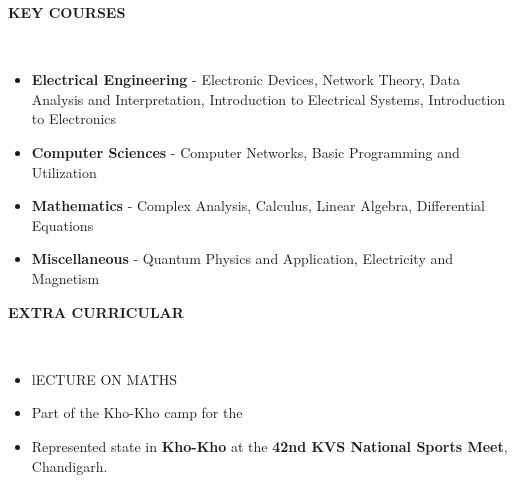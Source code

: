 \documentclass[a4paper,10pt]{article}
\newcommand{\lsep}{-0.5cm}
\newcommand{\resheading}[1]{{\small \colorbox{mygrey}{\begin{minipage}{0.975\textwidth}{\textbf{#1 \vphantom{p\^{E}}}}\end{minipage}}}}
\begin{document}
\resheading{\textbf{KEY COURSES} }\\[\lsep]
\begin{itemize}
\setlength\itemsep{0.1em}
\item \noindent \textbf{Electrical Engineering} - Electronic Devices, Network Theory, Data Analysis and Interpretation, Introduction to Electrical Systems, Introduction to Electronics
\item \noindent \textbf{Computer Sciences} - Computer Networks, Basic Programming and Utilization
\item \noindent \textbf{Mathematics} - Complex Analysis, Calculus, Linear Algebra, Differential Equations
\item \noindent \textbf{Miscellaneous} - Quantum Physics and Application, Electricity and Magnetism

\end{itemize}

\resheading{\textbf{EXTRA CURRICULAR} }\\[\lsep]
\begin{itemize}
\setlength\itemsep{0.1em}
\item \noindent lECTURE ON MATHS
\item \noindent Part of the Kho-Kho camp for the 
\item \noindent Represented state in \textbf{Kho-Kho} at the \textbf{42nd KVS National Sports Meet}, Chandigarh.


\end{itemize}
\end{document}
